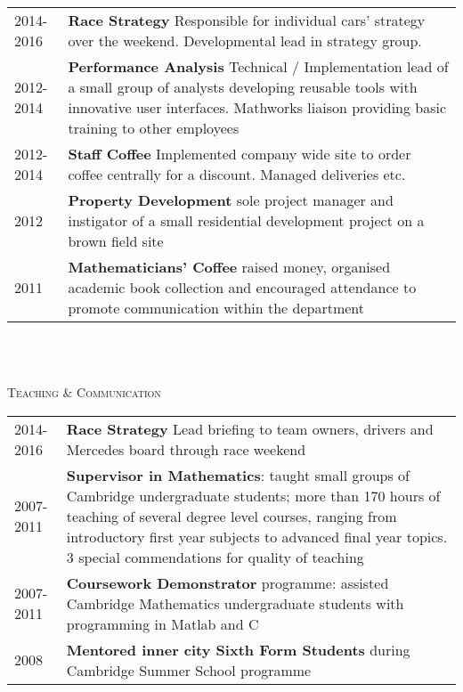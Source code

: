 \documentclass[a4paper,10pt]{article}
\newcommand{\lineunder}{\vspace*{0.2cm} \\ \hspace*{-20pt} \hrulefill \\ \vspace{-0.9cm}}
\newcommand{\header}[1]{{\hspace*{-17pt}\vspace*{6pt} \large{\textsc{#1}}}}
\begin{document}
\begin{tabular}{p{0.8in}p{5.3in}}
2014-2016 & \textbf{Race Strategy} Responsible for individual cars' strategy over the weekend. Developmental lead in strategy group. \\  
2012-2014 & \textbf{Performance Analysis} Technical / Implementation lead of a small group of analysts developing reusable tools with innovative user interfaces. Mathworks liaison providing basic training to other employees\\ 
2012-2014 & \textbf{Staff Coffee} Implemented company wide site to order coffee centrally for a discount. Managed deliveries etc.\\
2012      & \textbf{Property Development} sole project manager and instigator of a small residential development project on a brown field site\\
2011      & \textbf{Mathematicians' Coffee} raised money, organised academic book collection and encouraged attendance to promote communication within the department\\
\end{tabular}
\newline
\lineunder

\header{Teaching  \& Communication}

\begin{tabular}{p{0.8in}p{5.3in}}
2014-2016 & \textbf{Race Strategy} Lead briefing to team owners, drivers and Mercedes board through race weekend\\
2007-2011 & \textbf{Supervisor in Mathematics}: taught small groups of Cambridge undergraduate students; more than 170 hours of teaching of several degree level courses, ranging from introductory first year subjects to advanced final year topics. 3 special commendations for quality of teaching  \\ 
2007-2011 & \textbf{Coursework Demonstrator} programme: assisted Cambridge Mathematics undergraduate students with programming in Matlab and C\\
2008      & \textbf{Mentored inner city Sixth Form Students} during Cambridge Summer School programme \\
\end{tabular}
\newline
\lineunder
\end{document}
